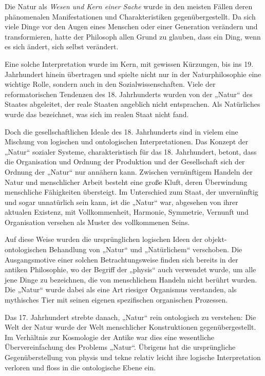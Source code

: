 \documentclass[11pt,a4paper]{article}
\begin{document}
Die Natur als \emph{Wesen und Kern einer Sache} wurde in den meisten Fällen
deren phänomenalen Manifestationen und Charakteristiken gegenübergestellt.  Da
sich viele Dinge vor den Augen eines Menschen oder einer Generation verändern
und transformieren, hatte der Philosoph allen Grund zu glauben, dass ein Ding,
wenn es sich ändert, sich selbst verändert.

Eine solche Interpretation wurde im Kern, mit gewissen Kürzungen, bis ins
19. Jahrhundert hinein übertragen und spielte nicht nur in der
Naturphilosophie eine wichtige Rolle, sondern auch in den
Sozialwissenschaften.  Viele der reformatorischen Tendenzen des
18. Jahrhunderts wurden von der „Natur“ des Staates abgeleitet, der reale
Staaten angeblich nicht entsprachen. Als Natürliches wurde das bezeichnet, was
sich im realen Staat nicht fand.

Doch die gesellschaftlichen Ideale des 18. Jahrhunderts sind in vielem eine
Mischung von logischen und ontologischen Interpretationen. Das Konzept der
„Natur“ sozialer Systeme, charakteristisch für das 18. Jahrhundert, betont,
dass die Organisation und Ordnung der Produktion und der Gesellschaft sich der
Ordnung der „Natur“ nur annähern kann. Zwischen vernünftigem Handeln der Natur
und menschlicher Arbeit besteht eine große Kluft, deren Überwindung
menschliche Fähigkeiten übersteigt. Im Unterschied zum Staat, der unvernünftig
und sogar unnatürlich sein kann, ist die „Natur“ war, abgesehen von ihrer
aktualen Existenz, mit Vollkommenheit, Harmonie, Symmetrie, Vernunft und
Organisation versehen als Muster des vollkommenen Seins.

Auf diese Weise wurden die ursprünglichen logischen Ideen der
objekt-ontologischen Behandlung von „Natur“ und „Natürlichem“ verschoben. Die
Ausgangsmotive einer solchen Betrachtungsweise finden sich bereits in der
antiken Philosophie, wo der Begriff der „physis“ auch verwendet wurde, um alle
jene Dinge zu bezeichnen, die von menschlichem Handeln nicht berührt wurden.
Die „Natur“ wurde dabei als eine Art riesiger Organismus verstanden, als
mythisches Tier mit seinen eigenen spezifischen organischen Prozessen.

Das 17. Jahrhundert strebte danach, „Natur“ rein ontologisch zu verstehen: Die
Welt der Natur wurde der Welt menschlicher Konstruktionen gegenübergestellt.
Im Verhältnis zur Kosmologie der Antike war dies eine wesentliche
Übervereinfachung des Problems „Natur“.  Übrigens hat die ursprüngliche
Gegenüberstellung von physis und tekne relativ leicht ihre logische
Interpretation verloren und floss in die ontologische Ebene ein.
\end{document}
